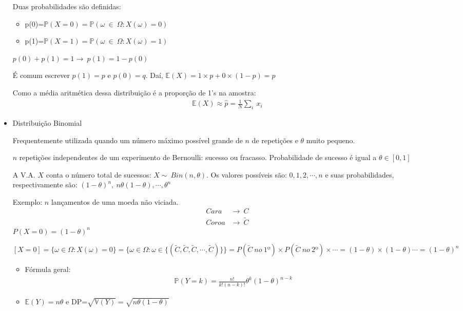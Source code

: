 \documentclass[11pt,a4paper]{book}
\begin{document}
\begin{itemize}
		Duas probabilidades são definidas:
		\begin{itemize}
			\item p(0)=$\mathbb{P}(X=0)=\mathbb{P}(\omega~\in~\Omega:X(\omega)=0)$
			\item p(1)=$\mathbb{P}(X=1)=\mathbb{P}(\omega~\in~\Omega:X(\omega)=1)$
		\end{itemize}
		
		$p(0)+p(1)=1\rightarrow~p(1)=1-p(0)$
		
		É comum escrever $p(1)=p$ e $p(0)=q$.
		Daí, $\mathbb{E}(X)=1\times p+0\times(1-p)=p$
		
		Como a média aritmética dessa distribuição é a proporção de 1's na amostra:
		\begin{align*}
			\mathbb{E}(X)\approx\hat{p}=\frac{1}{N}\sum_i~x_i
		\end{align*}
		
		\item Distribuição Binomial
		
		Frequentemente utilizada quando um número máximo possível grande de $n$ de repetições e $\theta$ muito pequeno.
		
		$n$ repetições independentes de um experimento de Bernoulli: sucesso ou fracasso.
		Probabilidade de sucesso é igual a $\theta\in[0,1]$ 
		
		A V.A. $X$ conta o número total de sucessos: $X\sim~Bin(n,\theta)$.
		Os valores possíveis são: $0,1,2,\cdots,n$ e suas probabilidades, respectivamente são: $(1-\theta)^n,~n\theta(1-\theta),\cdots,\theta^n$
		
		Exemplo: $n$ lançamentos de uma moeda não viciada.
		\begin{align*}
			Cara&\rightarrow~C\\
			Coroa&\rightarrow~\tilde{C}
		\end{align*}
		$P(X=0) = (1-\theta)^{n}$
			
		$[X=0]=\lbrace\omega \in \Omega:X(\omega)=0\rbrace=\lbrace\omega \in \Omega: \omega \in \lbrace(\tilde{C},\tilde{C},\tilde{C},\cdots,\tilde{C})\rbrace\rbrace=P(\tilde{C}~no~1º)\times P(\tilde{C}~no~2º)\times \cdots = (1-\theta)\times(1-\theta)\cdots = (1-\theta)^{n}$
		
		\begin{itemize}
			\item Fórmula geral:
			\begin{align*}
				\mathbb{P}(Y=k)=\frac{n!}{k!(n-k)!}\theta^k(1-\theta)^{n-k}
			\end{align*}
			\item $\mathbb{E}(Y)=n\theta$ e DP=$\sqrt{\mathbb{V}(Y)}=\sqrt{n\theta(1-\theta)}$
		\end{itemize}
		

\end{itemize}
\end{document}

